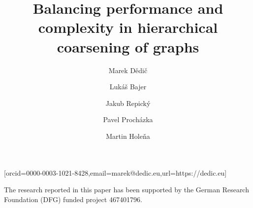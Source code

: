 





\title{Balancing performance and complexity in hierarchical coarsening of graphs}
\author[1,2]{Marek Dědič}[orcid=0000-0003-1021-8428,email=marek@dedic.eu,url=https://dedic.eu]
\cormark[1]
\author[2]{Lukáš Bajer}
\author[2]{Jakub Repický}
\author[2]{Pavel Procházka}
\author[3]{Martin Holeňa}

\address[1]{Czech Technical University in Prague, Břehová 7, Prague, Czech Republic}
\address[2]{Cisco Systems, Inc., Karlovo náměstı́ 10, Prague, Czech Republic}
\address[3]{Institute of Computer Science, Czech Academy of Sciences, Pod vodárenskou věží 2, Prague, Czech Republic}




\maketitle








\begin{acknowledgments}
  The research reported in this paper has been supported by the German Research Foundation (DFG) funded project 467401796.
\end{acknowledgments}



\appendix




